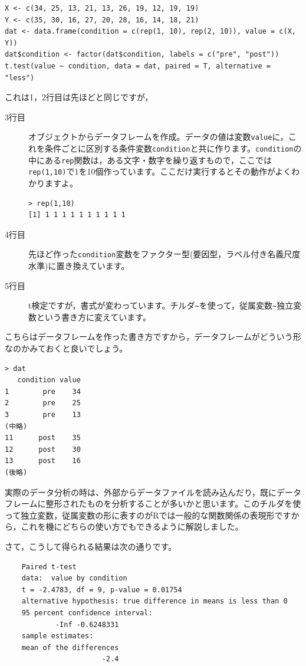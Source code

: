 \documentclass{ltjsbook}
\begin{document}
\begin{lstlisting}
X <- c(34, 25, 13, 21, 13, 26, 19, 12, 19, 19)
Y <- c(35, 30, 16, 27, 20, 28, 16, 14, 18, 21)
dat <- data.frame(condition = c(rep(1, 10), rep(2, 10)), value = c(X, Y))
dat$condition <- factor(dat$condition, labels = c("pre", "post"))
t.test(value ~ condition, data = dat, paired = T, alternative = "less")
\end{lstlisting}
これは1，2行目は先ほどと同じですが，
\begin{description}
    \item[3行目] オブジェクトからデータフレームを作成。データの値は変数\texttt{value}に，これを条件ごとに区別する条件変数\texttt{condition}と共に作ります。\texttt{condition}の中にある\texttt{rep}関数は，ある文字・数字を繰り返すもので，ここでは\texttt{rep(1,10)}で1を10個作っています。ここだけ実行するとその動作がよくわかりますよ。
    \begin{tcolorbox}
        \begin{verbatim}
> rep(1,10)
[1] 1 1 1 1 1 1 1 1 1 1\end{verbatim}
        \end{tcolorbox}
    \item[4行目] 先ほど作った\texttt{condition}変数をファクター型(要因型，ラベル付き名義尺度水準)に置き換えています。
    \item[5行目] t検定ですが，書式が変わっています。チルダ\texttt{\~}を使って，従属変数\verb|~|独立変数という書き方に変えています。
\end{description}
こちらはデータフレームを作った書き方ですから，データフレームがどういう形なのかみておくと良いでしょう。
\begin{tcolorbox}
\begin{verbatim}
> dat
   condition value
1        pre    34
2        pre    25
3        pre    13
(中略)
11      post    35
12      post    30
13      post    16
(後略)
\end{verbatim}
\end{tcolorbox}
実際のデータ分析の時は、外部からデータファイルを読み込んだり，既にデータフレームに整形されたものを分析することが多いかと思います。このチルダを使って独立変数，従属変数の形に表すのがRでは一般的な関数関係の表現形ですから，これを機にどちらの使い方でもできるように解説しました。

さて，こうして得られる結果は次の通りです。
\begin{tcolorbox}
\begin{verbatim}
    Paired t-test
    data:  value by condition
    t = -2.4783, df = 9, p-value = 0.01754
    alternative hypothesis: true difference in means is less than 0
    95 percent confidence interval:
            -Inf -0.6248331
    sample estimates:
    mean of the differences 
                       -2.4 
\end{verbatim}
\end{tcolorbox}
\end{document}
